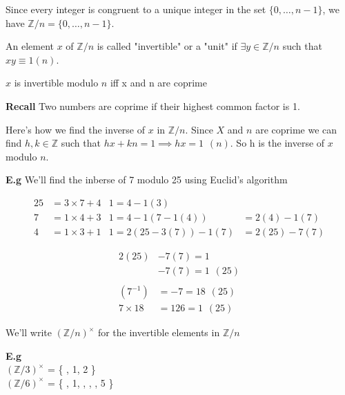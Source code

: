 \documentclass[11pt]{article}
\begin{document}
	Since every integer is congruent to a unique integer in the set $\{0,\dots, n-1\}$, we have $\mathbb{Z}/n = \{0,\dots, n-1\}$.

	An element $x$ of $\mathbb{Z}/n $ is called "invertible" or a "unit" if $\exists y \in \mathbb{Z}/n$ such that $xy \equiv 1 (n)$.

	\begin{theorem}
$x$ is invertible modulo $n$ iff x and n are coprime
	\end{theorem}
	\textbf{Recall} Two numbers are coprime if their highest common factor is 1.

	Here's how we find the inverse of $x$ in $\mathbb{Z}/n$. Since $X$ and $n$ are coprime we can find $h, k \in \mathbb{Z}$ such that $hx+kn = 1 \implies hx = 1 \hspace{5pt} (n)$. So h is the inverse of $x$ modulo $n$.

	\begin{flushleft}
		\textbf{E.g} We'll find the inberse of 7 modulo 25 using Euclid's algorithm

		\begin{align*}
			25 &= 3\times7 + 4   &1=4-1(3) \hspace{15pt}\\
			7 &= 1\times4 + 3    &1= 4-1(7-1(4))&=2(4)-1(7)\\
			4&= 1\times3+1	     &1 = 2(25-3(7)) - 1(7) &= 2(25) - 7(7)
		\end{align*}

		\begin{align*}
			2(25) &- 7(7) = 1 \\
			&-7(7) = 1 \hspace{5pt}(25) \\
			\\(7^{-1}) &= -7= 18 \hspace{5pt} (25) \\
			7\times 18 &= 126 = 1 \hspace{5pt} (25) 
		\end{align*}
	\end{flushleft}

	We'll write $(\mathbb{Z}/n)^{\times}$ for the invertible elements in $\mathbb{Z}/n $\\
\begin{flushleft}
		\textbf{E.g} \\ $(\mathbb{Z}/3)^{\times}$ = \{ , 1, 2 \}\\ 
			$(\mathbb{Z}/6)^{\times}$ = \{ , 1, , , , 5 \} 


\end{flushleft}
\end{document}

